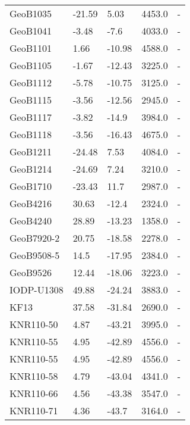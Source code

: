 \begin{longtable}{lllrl}
         GeoB1035 &   -21.59 &      5.03 &     4453.0 &         - \\
         GeoB1041 &    -3.48 &      -7.6 &     4033.0 &         - \\
         GeoB1101 &     1.66 &    -10.98 &     4588.0 &         - \\
         GeoB1105 &    -1.67 &    -12.43 &     3225.0 &         - \\
         GeoB1112 &    -5.78 &    -10.75 &     3125.0 &         - \\
         GeoB1115 &    -3.56 &    -12.56 &     2945.0 &         - \\
         GeoB1117 &    -3.82 &     -14.9 &     3984.0 &         - \\
         GeoB1118 &    -3.56 &    -16.43 &     4675.0 &         - \\
         GeoB1211 &   -24.48 &      7.53 &     4084.0 &         - \\
         GeoB1214 &   -24.69 &      7.24 &     3210.0 &         - \\
         GeoB1710 &   -23.43 &      11.7 &     2987.0 &         - \\
         GeoB4216 &    30.63 &     -12.4 &     2324.0 &         - \\
         GeoB4240 &    28.89 &    -13.23 &     1358.0 &         - \\
       GeoB7920-2 &    20.75 &    -18.58 &     2278.0 &         - \\
       GeoB9508-5 &     14.5 &    -17.95 &     2384.0 &         - \\
         GeoB9526 &    12.44 &    -18.06 &     3223.0 &         - \\
       IODP-U1308 &    49.88 &    -24.24 &     3883.0 &         - \\
             KF13 &    37.58 &    -31.84 &     2690.0 &         - \\
        KNR110-50 &     4.87 &    -43.21 &     3995.0 &         - \\
        KNR110-55 &     4.95 &    -42.89 &     4556.0 &         - \\
        KNR110-55 &     4.95 &    -42.89 &     4556.0 &         - \\
        KNR110-58 &     4.79 &    -43.04 &     4341.0 &         - \\
        KNR110-66 &     4.56 &    -43.38 &     3547.0 &         - \\
        KNR110-71 &     4.36 &     -43.7 &     3164.0 &         - \\

\end{longtable}
